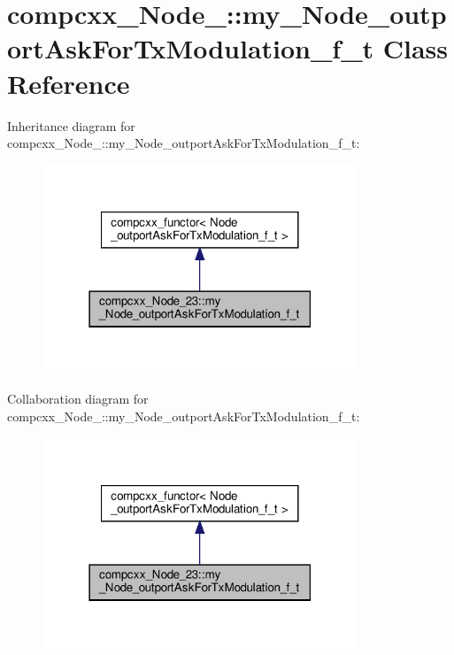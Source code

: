 \hypertarget{classcompcxx__Node__23_1_1my__Node__outportAskForTxModulation__f__t}{}\section{compcxx\+\_\+\+Node\+\_\+:\+:my\+\_\+\+Node\+\_\+outport\+Ask\+For\+Tx\+Modulation\+\_\+f\+\_\+t Class Reference}
\label{classcompcxx__Node__23_1_1my__Node__outportAskForTxModulation__f__t}


Inheritance diagram for compcxx\+\_\+\+Node\+\_\+:\+:my\+\_\+\+Node\+\_\+outport\+Ask\+For\+Tx\+Modulation\+\_\+f\+\_\+t\+:\nopagebreak
\begin{figure}[H]
\begin{center}
\leavevmode
\includegraphics[width=267pt]{classcompcxx__Node__23_1_1my__Node__outportAskForTxModulation__f__t__inherit__graph}
\end{center}
\end{figure}


Collaboration diagram for compcxx\+\_\+\+Node\+\_\+:\+:my\+\_\+\+Node\+\_\+outport\+Ask\+For\+Tx\+Modulation\+\_\+f\+\_\+t\+:\nopagebreak
\begin{figure}[H]
\begin{center}
\leavevmode
\includegraphics[width=267pt]{classcompcxx__Node__23_1_1my__Node__outportAskForTxModulation__f__t__coll__graph}
\end{center}
\end{figure}
